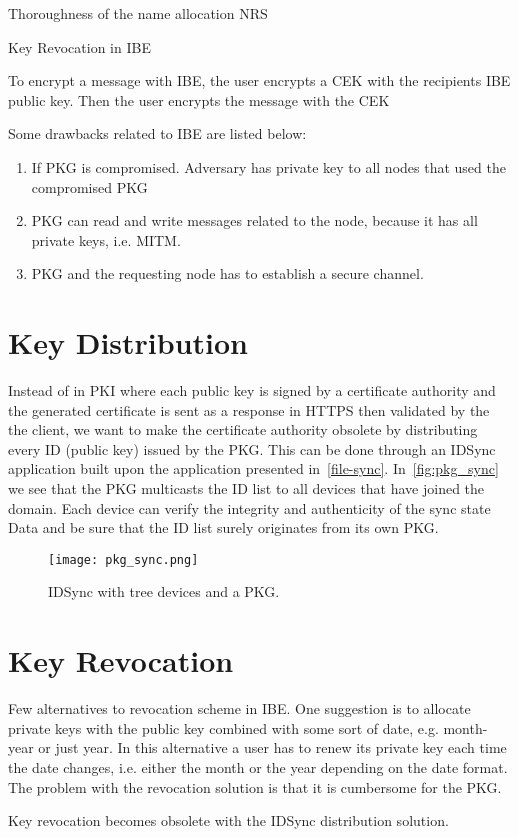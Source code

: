 
Thoroughness of the name allocation \gls{NRS} 

Key Revocation in IBE ~\cite{DBLP:journals/iacr/BoldyrevaGK12} 

To encrypt a message with \gls{IBE}, the user encrypts a \gls{CEK} with the recipients \gls{IBE} public key.
Then the user encrypts the message with the \gls{CEK}~\cite[section 2.2.2]{rfc5408}

Some drawbacks related to \gls{IBE} are listed below:
\begin{enumerate}
	\item If \gls{PKG} is compromised. Adversary has private key to all nodes that used the compromised \gls{PKG}
	\item \gls{PKG} can read and write messages related to the node, because it has all private keys, i.e. \gls{MITM}.
	\item \gls{PKG} and the requesting node has to establish a secure channel. 
\end{enumerate}

\section{Key Distribution}
Instead of in \gls{PKI} where each public key is signed by a certificate authority and the generated certificate is sent as a response in \gls{HTTPS} then validated by the the client, we want to make the certificate authority obsolete by distributing every \gls{ID} (public key) issued by the \gls{PKG}.
This can be done through an IDSync application built upon the application presented in~\autoref{file-sync}.
In~\autoref{fig:pkg_sync} we see that the \gls{PKG} multicasts the \gls{ID} list to all devices that have joined the domain.
Each device can verify the integrity and authenticity of the sync state Data and be sure that the \gls{ID} list surely originates from its own \gls{PKG}.
\begin{figure}[H]
  \centering
  \texttt{[image: pkg\_sync.png]}
  \caption{IDSync with tree devices and a \gls{PKG}.}
  \label{fig:pkg_sync}
\end{figure}

\section{Key Revocation}
Few alternatives to revocation scheme in \gls{IBE}.
One suggestion is to allocate private keys with the public key combined with some sort of date, e.g. month-year or just year. 
In this alternative a user has to renew its private key each time the date changes, i.e. either the month or the year depending on the date format.
The problem with the revocation solution is that it is cumbersome for the \gls{PKG}.


Key revocation becomes obsolete with the IDSync distribution solution. 
